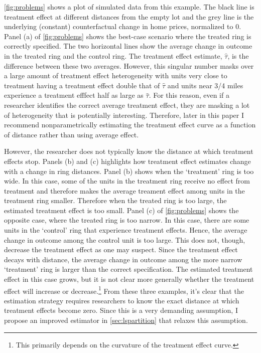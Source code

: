 \documentclass[10pt]{article}
\begin{document}
\autoref{fig:problems} shows a plot of simulated data from this example. The black line is treatment effect at different distances from the empty lot and the grey line is the underlying (constant) counterfactual change in home prices, normalized to 0. Panel (a) of \autoref{fig:problems} shows the best-case scenario where the treated ring is correctly specified. The two horizontal lines show the average change in outcome in the treated ring and the control ring. The treatment effect estimate, $\hat{\tau}$, is the difference between these two averages. However, this singular number masks over a large amount of treatment effect heterogeneity with units very close to treatment having a treatment effect double that of $\hat{\tau}$ and units near 3/4 miles experience a treatment efffect half as large as $\hat{\tau}$. For this reason, even if a researcher identifies the correct average treatment effect, they are masking a lot of heterogeneity that is potentially interesting. Therefore, later in this paper I recommend nonparametrically estimating the treatment effect curve as a function of distance rather than using average effect. 

However, the researcher does not typically know the distance at which treatment effects stop. Panels (b) and (c) highlights how treatment effect estimates change with a change in ring distances. Panel (b) shows when the `treatment' ring is too wide. In this case, some of the units in the treatment ring receive no effect from treatment and therefore makes the average treament effect among units in the treatment ring smaller. Therefore when the treated ring is too large, the estimated treatment effect is too small. Panel (c) of \autoref{fig:problems} shows the opposite case, where the treated ring is too narrow. In this case, there are some units in the `control' ring that experience treatment effects. Hence, the average change in outcome among the control unit is too large. This does not, though, decrease the treatment effect as one may suspect. Since the treatment effect decays with distance, the average change in outcome among the more narrow `treatment' ring is larger than the correct specification. The estimated treatment effect in this case grows, but it is not clear more generally whether the treatment effect will increase or decrease.\footnote{This primarily depends on the curvature of the treatment effect curve.} From these three examples, it's clear that the estimation strategy requires researchers to know the exact distance at which treatment effects become zero. Since this is a very demanding assumption, I propose an improved estimator in \autoref{sec:lspartition} that relaxes this assumption. 
\end{document}
